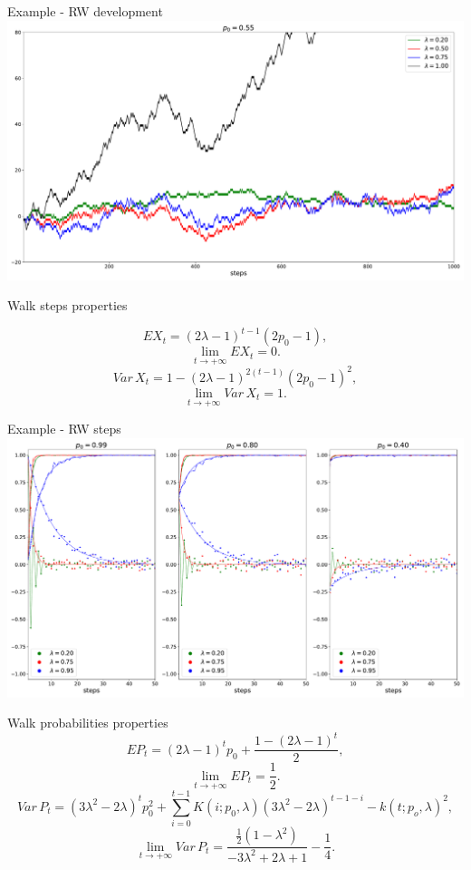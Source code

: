 \documentclass[american]{beamer}
\begin{document}
    \begin{frame}{Example - RW development}
        \includegraphics[width=1\textwidth]{../../simulations/single_walk_1000_steps_type_success_punished_p0_0.55}
    \end{frame}

    \begin{frame}{Walk steps properties}

        \[
            EX_{t}=(2\lambda-1)^{t-1}(2p_{0}-1),
        \]
        \[
            \lim_{t\to+\infty}EX_{t}=0.
        \]
        \[
            Var\,X_{t}=1-(2\lambda-1)^{2(t-1)}(2p_{0}-1)^{2},
        \]
        \[
            \lim_{t\to+\infty}Var\,X_{t}=1.
        \]

    \end{frame}

    \begin{frame}{Example - RW steps}
        \includegraphics[width=1\textwidth]{../../simulations/e_step_1000_walks_50_steps_type_success_punished}
    \end{frame}

    \begin{frame}{Walk probabilities properties}
        \[
            EP_{t}=(2\lambda-1)^{t}p_{0}+\frac{1-(2\lambda-1)^{t}}{2},
        \]
        \[
            \lim_{t\to+\infty}EP_{t}=\frac{1}{2}.
        \]
        \[
            Var\,P_{t}=(3\lambda^{2}-2\lambda)^{t}p_{0}^{2}+\sum_{i=0}^{t-1}K(i;p_{0},\lambda)(3\lambda^{2}-2\lambda)^{t-1-i}-k(t;p_{o},\lambda)^{2},
        \]
        \[
            \lim_{t\to+\infty}Var\,P_{t}=\frac{\frac{1}{2}(1-\lambda^{2})}{-3\lambda^{2}+2\lambda+1}-\frac{1}{4}.
        \]
    \end{frame}
\end{document}
